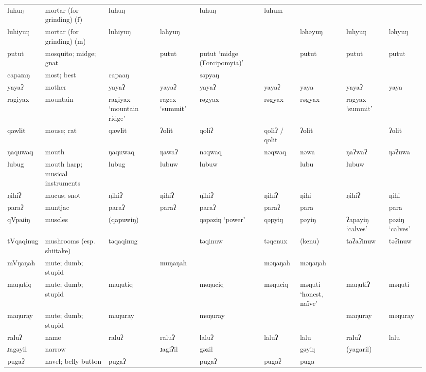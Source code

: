 \begin{landscape}
\begin{longtable}{*{9}{>{\raggedright\arraybackslash}p{}}}
\text{*}luhuŋ        & mortar (for grinding) (f) & luhuŋ &  & luhuŋ & luhum &  &  & \\
\text{*}luhiyuŋ      & mortar (for grinding) (m) & luhiyuŋ & lahyuŋ &  &  & ləhəyuŋ & luhyuŋ & ləhyuŋ\\
\text{*}putut        & mosquito; midge; gnat &  & putut & putut `midge (Forcipomyia)' &  & putut & putut & putut\\
\text{*}capəɹaŋ      & most; best & capaaŋ &  & səpyaŋ &  &  &  & \\
\text{*}yayaʔ        & mother & yayaʔ & yayaʔ & yayaʔ & yayaʔ & yaya & yayaʔ & yaya\\
\text{*}ragiyax      & mountain & ragiyax `mountain ridge' & ragex \newline `summit' & rəgyax & rəgyax & rəgyax & ragyax \newline `summit' & \\
\text{*}qawlit       & mouse; rat & qawlit & ʔolit & qoliʔ & qoliʔ / qolit & ʔolit &  & ʔolit\\
\text{*}ŋaquwaq      & mouth & ŋaquwaq & ŋawaʔ & nəqwaq & nəqwaq & nəwa & ŋaʔwaʔ & ŋəʔuwa\\
\text{*}lubug        & mouth harp; musical instruments & lubug & lubuw & lubuw &  & lubu & lubuw & \\
\text{*}ŋihiʔ        & mucus; snot & ŋihiʔ & ŋihiʔ & ŋihiʔ & ŋihiʔ & ŋihi & ŋihiʔ & ŋihi\\
\text{*}paraʔ        & muntjac & paraʔ & paraʔ & paraʔ & paraʔ & para &  & para\\
\text{*}qVpəɹiŋ      & muscles & (qapuwiŋ) &  & qəpəziŋ `power' & qəpyiŋ & pəyiŋ & ʔapayiŋ `calves' & pəziŋ `calves'\\
\text{*}tVqaqinug    & mushrooms (esp. shiitake) & təqaqinug &  & təqinuw & təqenux & (kenu) & taʔaʔinuw & təʔinuw\\
\text{*}mVŋaŋah      & mute; dumb; stupid &  & muŋaŋah &  & məŋaŋah & məŋaŋah &  & \\
\text{*}maŋutiq      & mute; dumb; stupid & maŋutiq &  & məŋuciq & məŋuciq & məŋuti `honest, naïve' & maŋutiʔ & məŋuti\\
\text{*}maŋuray      & mute; dumb; stupid & maŋuray &  & məŋuray &  &  & maŋuray & məŋuray\\
\text{*}raluʔ        & name & raluʔ & raluʔ & laluʔ & laluʔ & lalu & raluʔ & lalu\\
\text{*}ɹagəyil      & narrow &  & ɹagiʔil & gəzil &  & gəyiŋ & (yagaril) & \\
\text{*}pugaʔ        & navel; belly button & pugaʔ &  & pugaʔ & pugaʔ & puga &  & \\

\end{longtable}
\end{landscape}
